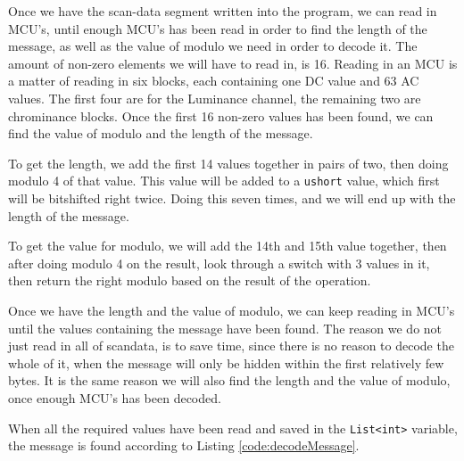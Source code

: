Once we have the scan-data segment written into the program, we can read in MCU's, until enough MCU's has been read in order to find the length of the message, as well as the value of modulo we need in order to decode it.
The amount of non-zero elements we will have to read in, is 16.
Reading in an MCU is a matter of reading in six blocks, each containing one DC value and 63 AC values. 
The first four are for the Luminance channel, the remaining two are chrominance blocks.
Once the first 16 non-zero values has been found, we can find the value of modulo and the length of the message.

To get the length, we add the first 14 values together in pairs of two, then doing modulo 4 of that value. 
This value will be added to a \lstinline|ushort| value, which first will be bitshifted right twice. 
Doing this seven times, and we will end up with the length of the message.

To get the value for modulo, we will add the 14th and 15th value together, then after doing modulo 4 on the result, look through a switch with 3 values in it, then return the right modulo based on the result of the operation.

Once we have the length and the value of modulo, we can keep reading in MCU's until the values containing the message have been found. 
The reason we do not just read in all of scandata, is to save time, since there is no reason to decode the whole of it, when the message will only be hidden within the first relatively few bytes.
It is the same reason we will also find the length and the value of modulo, once enough MCU's has been decoded.

When all the required values have been read and saved in the \lstinline|List<int>| variable, the message is found according to Listing \ref{code:decodeMessage}.

